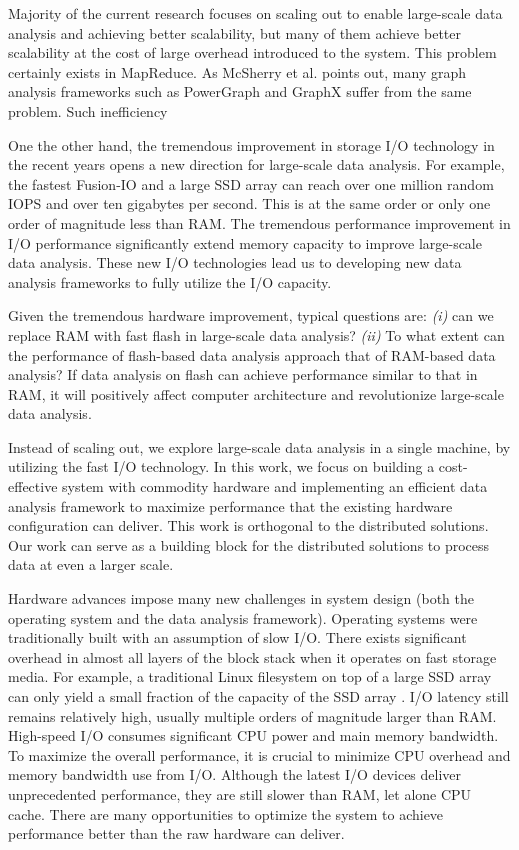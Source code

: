 Majority of the current research focuses on scaling out to enable large-scale
data analysis and achieving better scalability, but many of them achieve better
scalability at the cost of large overhead introduced to the system.
This problem certainly exists in MapReduce. As McSherry et al. \cite{mcsherry15}
points out, many graph analysis frameworks such as PowerGraph \cite{powergraph}
and GraphX \cite{graphx} suffer from the same problem. Such inefficiency

One the other hand, the tremendous improvement in storage I/O technology
in the recent years opens a new direction for large-scale data analysis.
For example, the fastest Fusion-IO \cite{fusionio} and a large SSD array
\cite{safs} can reach over
one million random IOPS and over ten gigabytes per second. This is at the same
order or only one order of magnitude less than RAM. The tremendous performance
improvement in I/O performance significantly extend memory capacity to improve
large-scale data analysis. These new I/O technologies lead us to developing
new data analysis frameworks to fully utilize the I/O capacity.

Given the tremendous hardware improvement, typical questions are: \textit{(i)}
can we replace RAM with fast flash in large-scale data analysis? \textit{(ii)}
To what extent
can the performance of flash-based data analysis approach that of RAM-based
data analysis? If data analysis on flash can achieve performance similar to
that in RAM, it will positively affect computer architecture and revolutionize
large-scale data analysis.

Instead of scaling out, we explore large-scale data analysis in a single machine,
by utilizing the fast I/O technology. In this work, we focus on building
a cost-effective system with commodity hardware and implementing an efficient
data analysis framework to maximize performance that the existing hardware
configuration can deliver. This work is orthogonal to the distributed solutions.
Our work can serve as a building block for the distributed solutions to process
data at even a larger scale.

Hardware advances impose many new challenges in system design (both the operating
system and the data analysis framework). Operating systems were traditionally
built with an assumption of slow I/O. There exists significant overhead in
almost all layers of the block stack when it operates on fast storage media.
For example, a traditional Linux filesystem on top of a large SSD array
can only yield a small fraction of the capacity of the SSD array \cite{safs}.
I/O latency still remains relatively high, usually multiple orders of magnitude
larger than RAM. High-speed I/O consumes significant CPU power and main memory
bandwidth. To maximize the overall performance, it is crucial to minimize CPU
overhead and memory bandwidth use from I/O. Although the latest I/O devices
deliver unprecedented performance, they are still slower than RAM, let alone
CPU cache. There are many opportunities to optimize the system to achieve
performance better than the raw hardware can deliver.

